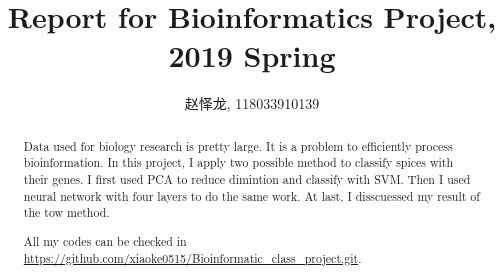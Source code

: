 \documentclass[sigchi]{acmart}
\begin{document}
\title{Report for Bioinformatics Project, 2019 Spring}

\author{赵怿龙, 118033910139}

\begin{abstract}
  Data used for biology research is pretty large. It is a problem to efficiently process bioinformation. In this project, I apply two possible method to classify spices with their genes. I first used PCA to reduce dimintion and classify with SVM. Then I used neural network with four layers to do the same work. At last, I disscuessed my result of the tow method.
  
  All my codes can be checked in \url{https://github.com/xiaoke0515/Bioinformatic_class_project.git}.
\end{abstract}




\maketitle
\end{document}
